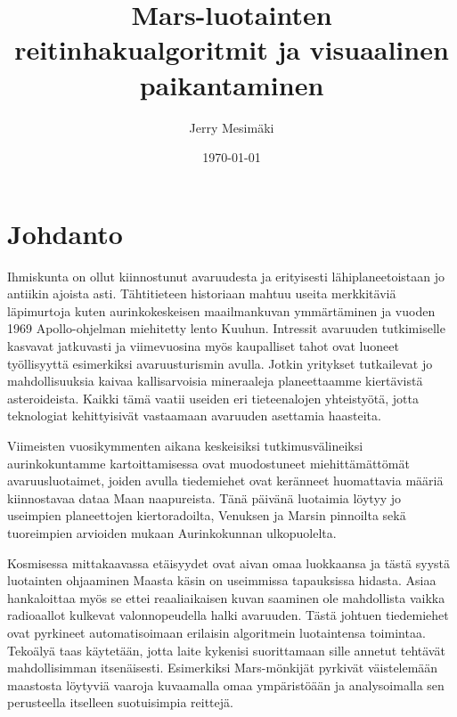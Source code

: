 \documentclass[finnish]{tktltiki2}
\title{Mars-luotainten reitinhakualgoritmit ja visuaalinen paikantaminen}
\author{Jerry Mesimäki}
\date{\today}
\theoremstyle{definition}
\theoremstyle{remark}
\begin{document}

\frontmatter      %

\maketitle        %
\makeabstract     %

\tableofcontents  %


\mainmatter       %

\section{Johdanto}

Ihmiskunta on ollut kiinnostunut avaruudesta ja erityisesti lähiplaneetoistaan jo antiikin ajoista asti. Tähtitieteen historiaan mahtuu useita merkkitäviä läpimurtoja kuten aurinkokeskeisen maailmankuvan ymmärtäminen ja vuoden 1969 Apollo-ohjelman miehitetty lento Kuuhun. Intressit avaruuden tutkimiselle kasvavat jatkuvasti ja viimevuosina myös kaupalliset tahot ovat luoneet työllisyyttä esimerkiksi avaruusturismin avulla. Jotkin yritykset tutkailevat jo mahdollisuuksia kaivaa kallisarvoisia mineraaleja planeettaamme kiertävistä asteroideista. Kaikki tämä vaatii useiden eri tieteenalojen yhteistyötä, jotta teknologiat kehittyisivät vastaamaan avaruuden asettamia haasteita.

Viimeisten vuosikymmenten aikana keskeisiksi tutkimusvälineiksi aurinkokuntamme kartoittamisessa ovat muodostuneet miehittämättömät avaruusluotaimet, joiden avulla tiedemiehet ovat keränneet huomattavia määriä kiinnostavaa dataa Maan naapureista. Tänä päivänä luotaimia löytyy jo useimpien planeettojen kiertoradoilta, Venuksen ja Marsin pinnoilta sekä tuoreimpien arvioiden mukaan Aurinkokunnan ulkopuolelta.

Kosmisessa mittakaavassa etäisyydet ovat aivan omaa luokkaansa ja tästä syystä luotainten ohjaaminen Maasta käsin on useimmissa tapauksissa hidasta. Asiaa hankaloittaa myös se ettei reaaliaikaisen kuvan saaminen ole mahdollista vaikka radioaallot kulkevat valonnopeudella halki avaruuden. Tästä johtuen tiedemiehet ovat pyrkineet automatisoimaan erilaisin algoritmein luotaintensa toimintaa. Tekoälyä taas käytetään, jotta laite kykenisi suorittamaan sille annetut tehtävät mahdollisimman itsenäisesti. Esimerkiksi Mars-mönkijät pyrkivät väistelemään maastosta löytyviä vaaroja kuvaamalla omaa ympäristöään ja analysoimalla sen perusteella itselleen suotuisimpia reittejä.
\end{document}
